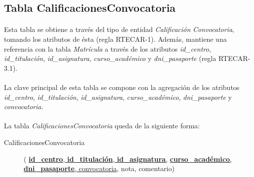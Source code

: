    \subsection{Tabla CalificacionesConvocatoria}

      \paragraph{}Esta tabla se obtiene a través del tipo de entidad
      \textit{Calificación Convocatoria}, tomando los atributos de ésta
      (regla RTECAR-1). Además, mantiene una referencia con la tabla
      \textit{Matrícula} a través de los atributos \textit{id\_centro},
      \textit{id\_titulación}, \textit{id\_asignatura},
      \textit{curso\_académico} y \textit{dni\_pasaporte} (regla RTECAR-3.1).

      \paragraph{}La clave principal de esta tabla se compone con la agregación
      de los atributos \textit{id\_centro}, \textit{id\_titulación},
      \textit{id\_asignatura}, \textit{curso\_académico},
      \textit{dni\_pasaporte} y \textit{convocatoria}.

      \paragraph{}La tabla \textit{CalificacionesConvocatoria} queda de la
      siguiente forma:

      \begin{description}
         \item[CalificacionesConvocatoria] \begin{flushleft}(
         \underline{\textbf{id\_centro}, \textbf{id\_titulación},
         \textbf{id\_asignatura},} \underline{\textbf{curso\_académico},
         \textbf{dni\_pasaporte}, convocatoria}, nota, comentario)
         \end{flushleft}
      \end{description}
